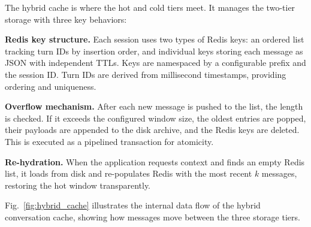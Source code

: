 \documentclass[conference]{IEEEtran}
\begin{document}
The hybrid cache is where the hot and cold tiers meet. It manages the two-tier storage with three key behaviors:

\textbf{Redis key structure.} Each session uses two types of Redis keys: an ordered list tracking turn IDs by insertion order, and individual keys storing each message as JSON with independent TTLs. Keys are namespaced by a configurable prefix and the session ID. Turn IDs are derived from millisecond timestamps, providing ordering and uniqueness.

\textbf{Overflow mechanism.} After each new message is pushed to the list, the length is checked. If it exceeds the configured window size, the oldest entries are popped, their payloads are appended to the disk archive, and the Redis keys are deleted. This is executed as a pipelined transaction for atomicity.

\textbf{Re-hydration.} When the application requests context and finds an empty Redis list, it loads from disk and re-populates Redis with the most recent $k$ messages, restoring the hot window transparently.

Fig.~\ref{fig:hybrid_cache} illustrates the internal data flow of the hybrid conversation cache, showing how messages move between the three storage tiers.
\end{document}
